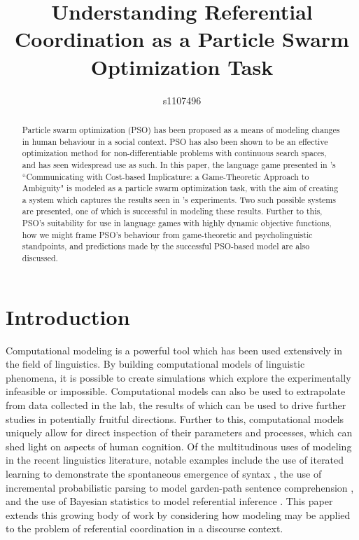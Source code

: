 \documentclass[12pt,a4paper]{article}
\begin{document}
\title{Understanding Referential Coordination as a Particle Swarm Optimization Task}
\author{s1107496}

\maketitle

\begin{abstract}
Particle swarm optimization (PSO) has been proposed as a means of modeling changes in human behaviour in a social context. PSO has also been shown to be an effective optimization method for non-differentiable problems with continuous search spaces, and has seen widespread use as such. In this paper, the language game presented in \citeauthor{rohde2012}'s ``Communicating with Cost-based Implicature: a Game-Theoretic Approach to Ambiguity" is modeled as a particle swarm optimization task, with the aim of creating a system which captures the results seen in \citeauthor{rohde2012}'s experiments. Two such possible systems are presented, one of which is successful in modeling these results. Further to this, PSO's suitability for use in language games with highly dynamic objective functions, how we might frame PSO's behaviour from game-theoretic and psycholinguistic standpoints, and predictions made by the successful PSO-based model are also discussed.
\end{abstract}


\tableofcontents


\section{Introduction}
Computational modeling is a powerful tool which has been used extensively in the field of linguistics. By building computational models of linguistic phenomena, it is possible to create simulations which explore the experimentally infeasible or impossible. Computational models can also be used to extrapolate from data collected in the lab, the results of which can be used to drive further studies in potentially fruitful directions. Further to this, computational models uniquely allow for direct inspection of their parameters and processes, which can shed light on aspects of human cognition. Of the multitudinous uses of modeling in the recent linguistics literature, notable examples include the use of iterated learning to demonstrate the spontaneous emergence of syntax \citep{kirby2002}, the use of incremental probabilistic parsing to model garden-path sentence comprehension \citep{hale2001}, and the use of Bayesian statistics to model referential inference \citep{frank2012}. This paper extends this growing body of work by considering how modeling may be applied to the problem of referential coordination in a discourse context.
\end{document}
